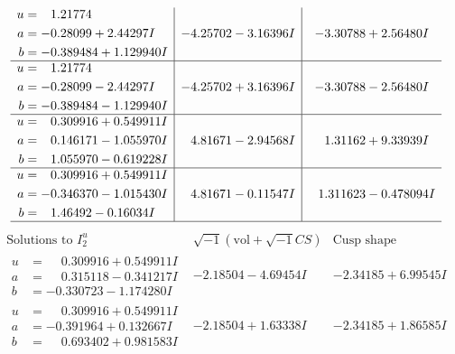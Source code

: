 \documentclass[1p]{elsarticle_modified}
\theoremstyle{definition}
\newcommand{\I}{\sqrt{-1}}
\begin{document}
$$\begin{array}{c|c|c}
\begin{aligned}
u &= \phantom{-}1.21774\phantom{ +0.000000I} \\
a &= -0.28099 + 2.44297 I \\
b &= -0.389484 + 1.129940 I\end{aligned}
 & -4.25702 - 3.16396 I & -3.30788 + 2.56480 I \\ \hline\begin{aligned}
u &= \phantom{-}1.21774\phantom{ +0.000000I} \\
a &= -0.28099 - 2.44297 I \\
b &= -0.389484 - 1.129940 I\end{aligned}
 & -4.25702 + 3.16396 I & -3.30788 - 2.56480 I \\ \hline\begin{aligned}
u &= \phantom{-}0.309916 + 0.549911 I \\
a &= \phantom{-}0.146171 - 1.055970 I \\
b &= \phantom{-}1.055970 - 0.619228 I\end{aligned}
 & \phantom{-}4.81671 - 2.94568 I & \phantom{-}1.31162 + 9.33939 I \\ \hline\begin{aligned}
u &= \phantom{-}0.309916 + 0.549911 I \\
a &= -0.346370 - 1.015430 I \\
b &= \phantom{-}1.46492 - 0.16034 I\end{aligned}
 & \phantom{-}4.81671 - 0.11547 I & \phantom{-}1.311623 - 0.478094 I\\
 \hline 
 \end{array}$$\newpage$$\begin{array}{c|c|c}  
\text{Solutions to }I^u_{2}& \I (\text{vol} + \sqrt{-1}CS) & \text{Cusp shape}\\
 \hline 
\begin{aligned}
u &= \phantom{-}0.309916 + 0.549911 I \\
a &= \phantom{-}0.315118 - 0.341217 I \\
b &= -0.330723 - 1.174280 I\end{aligned}
 & -2.18504 - 4.69454 I & -2.34185 + 6.99545 I \\ \hline\begin{aligned}
u &= \phantom{-}0.309916 + 0.549911 I \\
a &= -0.391964 + 0.132667 I \\
b &= \phantom{-}0.693402 + 0.981583 I\end{aligned}
 & -2.18504 + 1.63338 I & -2.34185 + 1.86585 I \\ \hline\begin{aligned}

\end{aligned}
\end{array}$$
\end{document}
